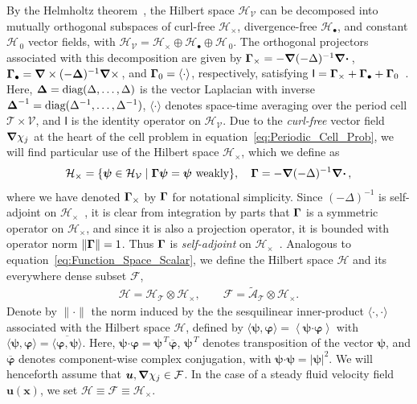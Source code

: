 \documentclass[leqno,onefignum,onetabnum]{siamltex1213}
\newcommand{\Tc}{\mathcal{T}}
\newcommand{\Vc}{\mathcal{V}}
\newcommand{\Hc}{\mathcal{H}}
\newcommand{\Fc}{\mathcal{F}}
\newcommand{\Ac}{\mathcal{A}}
\newcommand{\Ib}{\mathsf{I}}
\newcommand\bDelta{\mbox{\boldmath${\Delta}$}}
\newcommand\bGamma{\mbox{\boldmath${\Gamma}$}}
\newcommand\bnabla{\mbox{\boldmath${\nabla}$}}
\providecommand\bcdot{\boldsymbol{\cdot}}
\newcommand{\vecx}{\boldsymbol{x}}
\newcommand{\vecu}{\boldsymbol{u}}
\newcommand{\vecpsi}{\boldsymbol{\psi}}
\newcommand{\vecvarphi}{\boldsymbol{\varphi}}
\begin{document}
By the Helmholtz theorem~\cite{Denaro:2003:0271,Bhatia:IEE:1077}, the
Hilbert space $\Hc_{\Vc}$ can be decomposed into mutually orthogonal
subspaces of curl-free $\Hc_\times$, divergence-free $\Hc_\bullet$, and constant
$\Hc_{\,0}$ vector fields, with $\Hc_{\Vc}=\Hc_\times\oplus\Hc_\bullet\oplus\Hc_{\,0}$.  The orthogonal projectors associated with this decomposition are given by 
$\bGamma_\times=-\bnabla(-\Delta)^{-1}\bnabla \bcdot\,$,
$\bGamma_\bullet=\bnabla\times(-\bDelta)^{-1}\bnabla \times\,$, and $\bGamma_0=\langle\cdot\rangle$, 
respectively, satisfying
$\Ib=\bGamma_\times+\bGamma_\bullet+\bGamma_0$~\cite{Fannjiang:1994:SIAM_JAM:333,Novikov:2005:CPAM:867,MILTON:2002:TC}. Here, 
$\bDelta=\text{diag}(\Delta,\ldots,\Delta)$ is the vector Laplacian with inverse
$\bDelta^{-1}=\text{diag}(\Delta^{-1},\ldots,\Delta^{-1})$, $\langle\cdot\rangle$ denotes space-time
averaging over the period cell $\Tc\times\Vc$, and $\Ib$ is the identity
operator on $\Hc_{\Vc}$. Due to the \emph{curl-free} vector field
$\bnabla\chi_j$ at the heart of the cell problem in
equation~\eqref{eq:Periodic_Cell_Prob}, we will find particular use of
the Hilbert space $\Hc_\times$, which we define as 
%
\begin{align}\label{eq:Hilbert_Curl_Free}
  \Hc_\times=\{\vecpsi\in\Hc_{\Vc} \; | \; \bGamma\vecpsi=\vecpsi \text{ weakly}\},
  \quad
  \bGamma=-\bnabla(-\Delta)^{-1}\bnabla \bcdot\,,
\end{align}
%
where we have denoted $\bGamma_\times$ by $\bGamma$ for notational
simplicity. Since $(-\Delta)^{-1}$ is self-adjoint on
$\Hc_\times$~\cite{Stakgold:BVP:2000}, it is clear from integration by parts
that $\bGamma$ is a symmetric operator on $\Hc_\times$, and since it is also
a projection operator, it is bounded with operator norm
$\|\bGamma\|=1$. Thus $\bGamma$ is \emph{self-adjoint} on
$\Hc_\times$~\cite{Stone:64,Reed-1980}.  Analogous to
equation~\eqref{eq:Function_Space_Scalar}, we define the Hilbert space
$\Hc$ and its everywhere dense subset $\Fc$,   
%
\begin{align}\label{eq:Function_Space_Vector} 
  \Hc=\Hc_{\Tc}\otimes\Hc_\times,  \qquad
  \Fc=\tilde{\Ac}_{\Tc}\otimes\Hc_\times.
\end{align}
%
Denote by $\|\cdot\|$ the norm induced by the the sesquilinear inner-product
$\langle\cdot,\cdot\rangle$ associated with the Hilbert space $\Hc$, 
defined by $\langle\vecpsi,\vecvarphi\rangle=\left\langle\vecpsi\bcdot\vecvarphi\right\rangle$
with $\langle\vecpsi,\vecvarphi\rangle=\overline{\langle\vecvarphi,\vecpsi\rangle}$. Here,
$\vecpsi\bcdot\vecvarphi=\vecpsi^{\,T}\overline{\vecvarphi}$,
$\vecpsi^{\,T}$ denotes transposition of the vector $\vecpsi$, and
$\overline{\vecvarphi}$ denotes component-wise complex conjugation,
with $\vecpsi\bcdot\vecpsi=|\vecpsi|^2$. We will 
henceforth assume that $\vecu,\bnabla\chi_j\in\Fc$. In the case of a steady fluid
velocity field $\vecu(\vecx)$, we set $\Hc\equiv\Fc\equiv\Hc_\times$.
\end{document}
